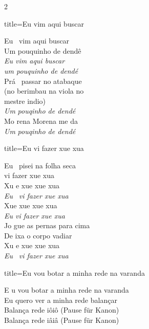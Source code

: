 \documentclass[fontsize=14pt, paper=a4, twoside, DIV=20]{scrreprt} %
\begin{document}
\begin{multicols*}{2}
\columnbreak

\begin{song}{title={Eu vim aqui buscar}}
        \begin{verse*}
            Eu \ vim aqui buscar\\
            Um pouquinho de dendê\\
            \textit{Eu vim aqui buscar}\\
            \textit{ um pouquinho de dendé}\\
            Prá \  passar no atabaque \\
            (no berimbau na viola no\\
            mestre indio)\\
            \textit{Um}\textit{ pouqinho de dendé}\\
            Mo rena Morena me da\\
            \textit{Um}\textit{ pouqinho de dendé}\\
        \end{verse*}
\end{song}

\begin{song}{title={Eu vi fazer xue xua }}
        \begin{verse*}
            Eu \ pisei na folha seca\\
            vi fazer xue xua\\
            Xu e xue xue xua\\
            \textit{Eu} \ \textit{vi fazer xue xua}\\
            Xue xue xue xua\\
            \textit{Eu vi fazer xue xua}\\
            Jo gue as pernas para cima\\
            De ixa o corpo vadiar\\
            Xu e xue xue xua\\
            \textit{Eu} \ \textit{vi fazer xue xua}\\
        \end{verse*}
\end{song}

\begin{song}{title={Eu vou botar a minha rede na varanda}}
        \begin{verse*}
            E u vou botar a minha rede na varanda\\
            Eu quero ver a minha rede balançar\\
            Balança rede iôiô (Pause für Kanon)\\
            Balança rede iâiâ (Pause für Kanon)\\
        \end{verse*}
\end{song}


\end{multicols*}
\end{document}
